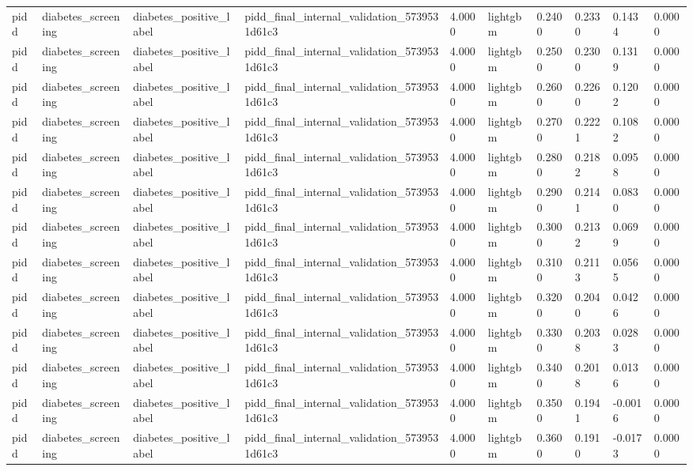 \begin{tabular}{llllllllll}
pidd & diabetes\_screening & diabetes\_positive\_label & pidd\_final\_internal\_validation\_5739531d61c3 & 4.0000 & lightgbm & 0.2400 & 0.2330 & 0.1434 & 0.0000 \\
pidd & diabetes\_screening & diabetes\_positive\_label & pidd\_final\_internal\_validation\_5739531d61c3 & 4.0000 & lightgbm & 0.2500 & 0.2300 & 0.1319 & 0.0000 \\
pidd & diabetes\_screening & diabetes\_positive\_label & pidd\_final\_internal\_validation\_5739531d61c3 & 4.0000 & lightgbm & 0.2600 & 0.2260 & 0.1202 & 0.0000 \\
pidd & diabetes\_screening & diabetes\_positive\_label & pidd\_final\_internal\_validation\_5739531d61c3 & 4.0000 & lightgbm & 0.2700 & 0.2221 & 0.1082 & 0.0000 \\
pidd & diabetes\_screening & diabetes\_positive\_label & pidd\_final\_internal\_validation\_5739531d61c3 & 4.0000 & lightgbm & 0.2800 & 0.2182 & 0.0958 & 0.0000 \\
pidd & diabetes\_screening & diabetes\_positive\_label & pidd\_final\_internal\_validation\_5739531d61c3 & 4.0000 & lightgbm & 0.2900 & 0.2141 & 0.0830 & 0.0000 \\
pidd & diabetes\_screening & diabetes\_positive\_label & pidd\_final\_internal\_validation\_5739531d61c3 & 4.0000 & lightgbm & 0.3000 & 0.2132 & 0.0699 & 0.0000 \\
pidd & diabetes\_screening & diabetes\_positive\_label & pidd\_final\_internal\_validation\_5739531d61c3 & 4.0000 & lightgbm & 0.3100 & 0.2113 & 0.0565 & 0.0000 \\
pidd & diabetes\_screening & diabetes\_positive\_label & pidd\_final\_internal\_validation\_5739531d61c3 & 4.0000 & lightgbm & 0.3200 & 0.2040 & 0.0426 & 0.0000 \\
pidd & diabetes\_screening & diabetes\_positive\_label & pidd\_final\_internal\_validation\_5739531d61c3 & 4.0000 & lightgbm & 0.3300 & 0.2038 & 0.0283 & 0.0000 \\
pidd & diabetes\_screening & diabetes\_positive\_label & pidd\_final\_internal\_validation\_5739531d61c3 & 4.0000 & lightgbm & 0.3400 & 0.2018 & 0.0136 & 0.0000 \\
pidd & diabetes\_screening & diabetes\_positive\_label & pidd\_final\_internal\_validation\_5739531d61c3 & 4.0000 & lightgbm & 0.3500 & 0.1941 & -0.0016 & 0.0000 \\
pidd & diabetes\_screening & diabetes\_positive\_label & pidd\_final\_internal\_validation\_5739531d61c3 & 4.0000 & lightgbm & 0.3600 & 0.1910 & -0.0173 & 0.0000 \\

\end{tabular}
